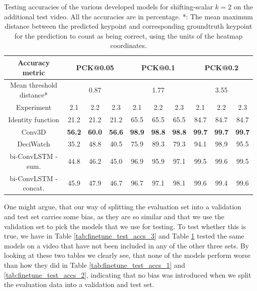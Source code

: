 \documentclass[./main.tex]{subfiles}
\begin{document}
\begin{table}[htbp]
    \begin{tabular}{c||ccc|ccc|ccc}
        \hline
        Accuracy metric & \multicolumn{3}{c}{PCK@0.05} & \multicolumn{3}{c}{PCK@0.1} & \multicolumn{3}{c}{PCK@0.2} \\
        \hline
        Mean threshold distance* & \multicolumn{3}{c}{0.87} & \multicolumn{3}{c}{1.77} & \multicolumn{3}{c}{3.55} \\
        \hline
        Experiment & 2.1 & 2.2 & 2.3 & 2.1 & 2.2 & 2.3 & 2.1 & 2.2 & 2.3 \\
        \hline
        \hline
        Identity function & 21.2 & 21.2 & 21.2 & 65.5 & 65.5 & 65.5 & 84.7 & 84.7 & 84.7 \\
        Conv3D & \textbf{56.2} & \textbf{60.0} & \textbf{56.6} & \textbf{98.9} & \textbf{98.8} & \textbf{98.8} & \textbf{99.7} & \textbf{99.7} & \textbf{99.7} \\
        DeciWatch & 35.2 & 48.8 & 40.5 & 75.9 & 89.3 & 79.3 & 94.1 & 98.9 & 95.5 \\
        bi-ConvLSTM - sum. & 44.8 & 46.2 & 45.0 & 96.9 & 95.9 & 97.1 & 99.5 & 99.6 & 99.5 \\
        bi-ConvLSTM - concat. & 45.9 & 47.9 & 46.7 & 96.7 & 97.1 & 98.1 & 99.6 & 99.4 & 99.6 \\
        \hline
    \end{tabular}
    \caption{Testing accuracies of the various developed models for shifting-scalar $k = 2$ on the additional test video. All the accuracies are in percentage. *: The mean maximum distance between the predicted keypoint and corresponding groundtruth keypoint for the prediction to count as being correct, using the units of the heatmap coordinates.}
    \label{tab:finetune_test_accs_4}
\end{table}

\noindent One might argue, that our way of splitting the evaluation set into a validation and test set carries some bias, as they are so similar and that we use the validation set to pick the models that we use for testing. To test whether this is true, we have in Table \ref{tab:finetune_test_accs_3} and Table \ref{tab:finetune_test_accs_4} tested the same models on a video that have not been included in any of the other three sets. By looking at these two tables we clearly see, that none of the models perform worse than how they did in Table \ref{tab:finetune_test_accs_1} and \ref{tab:finetune_test_accs_2}, indicating that no bias was introduced when we split the evaluation data into a validation and test set.
\end{document}
